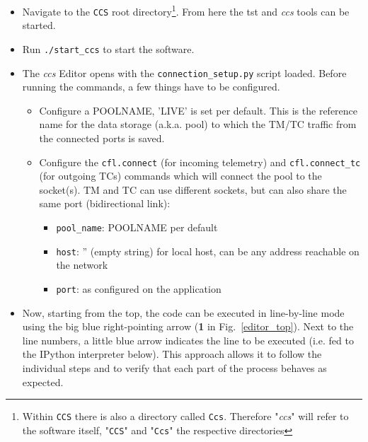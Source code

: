 \begin{itemize}

\item Navigate to the \texttt{CCS} root directory\footnote{Within \texttt{CCS} there is also a directory called \texttt{Ccs}. Therefore "\textit{ccs}" will refer to the software itself, "\texttt{CCS}" and "\texttt{Ccs}" the respective directories}.
From here the tst and \textit{ccs} tools can be started. %

\item Run \texttt{./start\_ccs} to start the software.

\item The \textit{ccs} Editor opens with the \texttt{connection\_setup.py} script loaded. Before running the commands, a few things have to be configured.

\begin{itemize}
  \renewcommand\labelitemi{--} 
  \item Configure a POOLNAME, 'LIVE' is set per default. This is the reference name for the data storage (a.k.a. pool) to which the TM/TC traffic from the connected ports is saved.
  
  \item Configure the \texttt{cfl.connect} (for incoming telemetry) and \texttt{cfl.connect\_tc} (for outgoing TCs) commands which will connect the pool to the socket(s).
  TM and TC can use different sockets, but can also share the same port (bidirectional link):
  \begin{itemize}
      \item \texttt{pool\_name}: POOLNAME per default
      \item \texttt{host}: '' (empty string) for local host, can be any address reachable on the network
      \item \texttt{port}: as configured on the application
  \end{itemize}
\end{itemize}

\item Now, starting from the top, the code can be executed in line-by-line mode using the big blue right-pointing arrow (\textbf{1} in Fig.~\ref{editor_top}).
      Next to the line numbers, a little blue arrow indicates the line to be executed (i.e. fed to the IPython interpreter below).
      This approach allows it to follow the individual steps and to verify that each part of the process behaves as expected.


\end{itemize}
